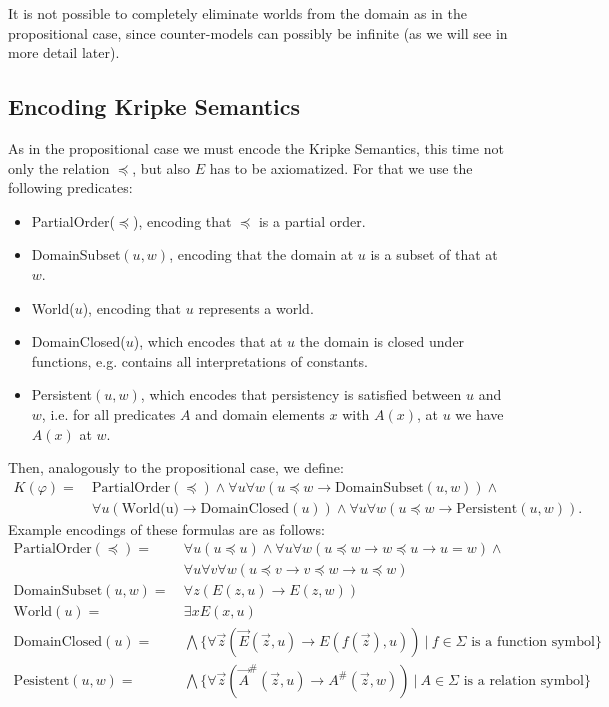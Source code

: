 \documentclass[a4paper,11pt]{report}
\theoremstyle{definition}
\theoremstyle{definition}
\theoremstyle{definition}
\theoremstyle{definition}
\theoremstyle{definition}
\theoremstyle{definition}
\theoremstyle{definition}
\begin{document}
	It is not possible to completely eliminate worlds from the domain as in the propositional case, since counter-models can possibly be infinite (as we will see in more detail later).

	
	\subsection{Encoding Kripke Semantics}
	
	As in the propositional case we must encode the Kripke Semantics, this time not only the relation $\preceq$, but also $E$ has to be axiomatized. For that we use the following predicates:
	\begin{itemize}
		\item PartialOrder($\preceq$), encoding that $\preceq$ is a partial order.
		\item DomainSubset$(u, w)$, encoding that the domain at $u$ is a subset of that at $w$.
		\item World($u$), encoding that $u$ represents a world.
		\item DomainClosed($u$), which encodes that at $u$ the domain is closed under functions, e.g. contains all interpretations of constants.
		\item Persistent$(u, w)$, which encodes that persistency is satisfied between $u$ and $w$, i.e. for all predicates $A$ and domain elements $x$ with $A(x)$, at $u$ we have $A(x)$ at $w$.
	\end{itemize}
	Then, analogously to the propositional case, we define:
	\begin{align*}
		K(\varphi) = \:& \text{PartialOrder}(\preceq) \wedge \forall u \forall w (u\preceq w\to \text{DomainSubset}(u, w)) \wedge\\
		& \forall u(\text{World(u)}\to \text{DomainClosed}(u))\wedge \forall u\forall w (u\preceq w\to \text{Persistent}(u, w)).
	\end{align*}
	Example encodings of these formulas are as follows:
	\begin{align*}
		\text{PartialOrder}(\preceq) = &\:\forall u(u\preceq u)\wedge\forall u\forall w(u\preceq w\to w\preceq u\to u = w)\wedge\\&\:\forall u\forall v\forall w(u\preceq v\to v\preceq w\to u\preceq w)\\
		\text{DomainSubset}(u, w) = &\:\forall z(E(z, u)\to E(z, w))\\
		\text{World}(u) = &\:\exists xE(x, u)\\
		\text{DomainClosed}(u) = &\:\bigwedge\{\forall\vec z(\vec E(\vec z, u)\to E(f(\vec z), u))\:|\:\text{$f\in\Sigma$ is a function symbol}\}\\
		\text{Pesistent}(u, w) = &\:\bigwedge\{\forall\vec z(\vec A^\#(\vec z, u)\to A^\#(\vec z, w))\:|\:\text{$A\in\Sigma$ is a relation symbol}\}
	\end{align*}
	
\end{document}

